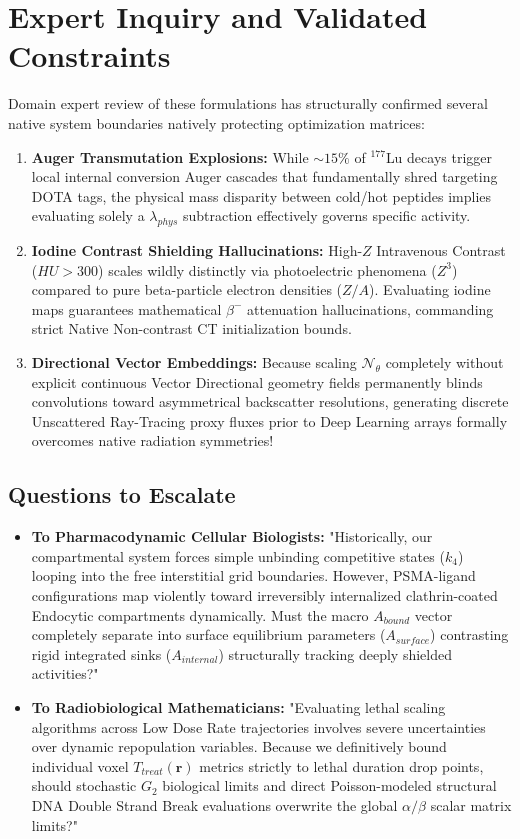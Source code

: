 \documentclass[11pt,a4paper]{article}
\begin{document}
\section{Expert Inquiry and Validated Constraints}

Domain expert review of these formulations has structurally confirmed several native system boundaries natively protecting optimization matrices:
\begin{enumerate}
    \item \textbf{Auger Transmutation Explosions:} While $\sim 15\%$ of $^{177}$Lu decays trigger local internal conversion Auger cascades that fundamentally shred targeting DOTA tags, the physical mass disparity between cold/hot peptides implies evaluating solely a $\lambda_{phys}$ subtraction effectively governs specific activity.
    \item \textbf{Iodine Contrast Shielding Hallucinations:} High-$Z$ Intravenous Contrast ($HU > 300$) scales wildly distinctly via photoelectric phenomena ($Z^3$) compared to pure beta-particle electron densities ($Z/A$). Evaluating iodine maps guarantees mathematical $\beta^-$ attenuation hallucinations, commanding strict Native Non-contrast CT initialization bounds.
    \item \textbf{Directional Vector Embeddings:} Because scaling $\mathcal{N}_\theta$ completely without explicit continuous Vector Directional geometry fields permanently blinds convolutions toward asymmetrical backscatter resolutions, generating discrete Unscattered Ray-Tracing proxy fluxes prior to Deep Learning arrays formally overcomes native radiation symmetries!
\end{enumerate}

\subsection{Questions to Escalate}
\begin{itemize}
    \item \textbf{To Pharmacodynamic Cellular Biologists:} "Historically, our compartmental system forces simple unbinding competitive states ($k_4$) looping into the free interstitial grid boundaries. However, PSMA-ligand configurations map violently toward irreversibly internalized clathrin-coated Endocytic compartments dynamically. Must the macro $A_{bound}$ vector completely separate into surface equilibrium parameters ($A_{surface}$) contrasting rigid integrated sinks ($A_{internal}$) structurally tracking deeply shielded activities?"
    \item \textbf{To Radiobiological Mathematicians:} "Evaluating lethal scaling algorithms across Low Dose Rate trajectories involves severe uncertainties over dynamic repopulation variables. Because we definitively bound individual voxel $T_{treat}(\mathbf{r})$ metrics strictly to lethal duration drop points, should stochastic $G_2$ biological limits and direct Poisson-modeled structural DNA Double Strand Break evaluations overwrite the global $\alpha / \beta$ scalar matrix limits?"
\end{itemize}
\end{document}
